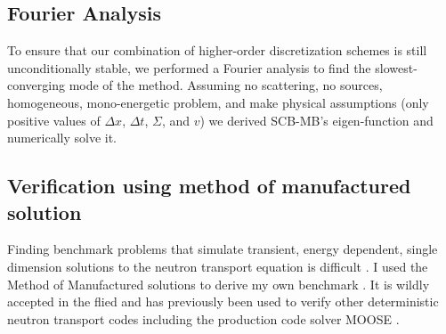 \subsection{Fourier Analysis}

To ensure that our combination of higher-order discretization schemes is still unconditionally stable, we performed a Fourier analysis to find the slowest-converging mode of the method.
Assuming no scattering, no sources, homogeneous, mono-energetic problem, and make physical assumptions (only positive values of $\Delta x$, $\Delta t$, $\Sigma$, and $v$) we derived SCB-MB's eigen-function and numerically solve it. 

\subsection{Verification using method of manufactured solution}

Finding benchmark problems that simulate transient, energy dependent, single dimension solutions to the neutron transport equation is difficult \cite{roy_review_2005}.
I used the Method of Manufactured solutions to derive my own benchmark \cite{nse_mms_warsaw}.
It is wildly accepted in the flied  and has previously been used to verify other deterministic neutron transport codes including the production code solver MOOSE \citep{wang_application_2018,moosemms}.


